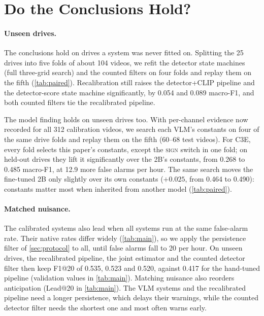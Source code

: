 \documentclass[conference]{IEEEtran}
\let\oldtextsc\textsc
\renewcommand{\textsc}[1]{\mbox{\oldtextsc{#1}}}
\begin{document}
\section{Do the Conclusions Hold?}
\label{sec:dd}

\paragraph{Unseen drives.}  The conclusions hold on drives a system was never fitted on.  Splitting the 25 drives into five folds of about 104 videos, we refit the detector state machines (full three-grid search) and the counted filters on four folds and replay them on the fifth (\cref{tab:paired}).  Recalibration still raises the detector+CLIP pipeline and the detector-score state machine significantly, by 0.054 and 0.089 macro-F1, and both counted filters tie the recalibrated pipeline.

The model finding holds on unseen drives too.  With per-channel evidence now recorded for all 312 calibration videos, we search each VLM's constants on four of the same drive folds and replay them on the fifth (60--68 test videos).  For C3E, every fold selects this paper's constants, except the \textsc{sign} switch in one fold; on held-out drives they lift it significantly over the 2B's constants, from 0.268 to 0.485 macro-F1, at 12.9 more false alarms per hour.  The same search moves the fine-tuned 2B only slightly over its own constants ($+0.025$, from 0.464 to 0.490): constants matter most when inherited from another model (\cref{tab:paired}).

\paragraph{Matched nuisance.}  The calibrated systems also lead when all systems run at the same false-alarm rate.  Their native rates differ widely (\cref{tab:main}), so we apply the persistence filter of \cref{sec:protocol} to all, until false alarms fall to 20 per hour.  On unseen drives, the recalibrated pipeline, the joint estimator and the counted detector filter then keep F1@20 of 0.535, 0.523 and 0.520, against 0.417 for the hand-tuned pipeline (validation values in \cref{tab:main}).  Matching nuisance also reorders anticipation (Lead@20 in \cref{tab:main}).  The VLM systems and the recalibrated pipeline need a longer persistence, which delays their warnings, while the counted detector filter needs the shortest one and most often warns early.
\end{document}
